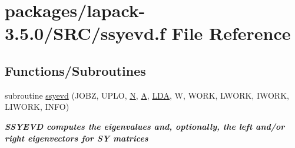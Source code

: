 \hypertarget{ssyevd_8f}{}\section{packages/lapack-\/3.5.0/\+S\+R\+C/ssyevd.f File Reference}
\label{ssyevd_8f}
\subsection*{Functions/\+Subroutines}
\begin{DoxyCompactItemize}
\item 
subroutine \hyperlink{group__realSYeigen_ga6b4d01c8952350ea557b90302ef9de4d}{ssyevd} (J\+O\+B\+Z, U\+P\+L\+O, \hyperlink{polmisc_8c_a0240ac851181b84ac374872dc5434ee4}{N}, \hyperlink{classA}{A}, \hyperlink{example__user_8c_ae946da542ce0db94dced19b2ecefd1aa}{L\+D\+A}, W, W\+O\+R\+K, L\+W\+O\+R\+K, I\+W\+O\+R\+K, L\+I\+W\+O\+R\+K, I\+N\+F\+O)
\begin{DoxyCompactList}\small\item\em {\bfseries  S\+S\+Y\+E\+V\+D computes the eigenvalues and, optionally, the left and/or right eigenvectors for S\+Y matrices} \end{DoxyCompactList}\end{DoxyCompactItemize}
